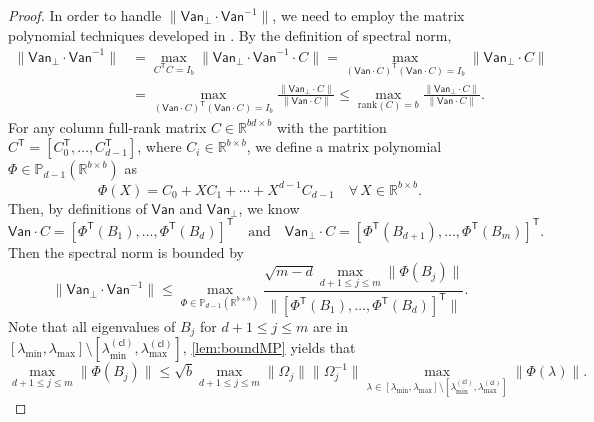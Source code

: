 \documentclass{article}
\newcommand{\Ttran}{\mathsf{T}}
\newcommand{\van}{\mathsf{Van}}
\newcommand{\poly}{\mathbb{P}}
\newcommand{\cl}{(\mathsf{cl})}
\newcommand{\R}{\mathbb{R}}
\newcommand{\rk}{\mathrm{rank}}
\providecommand{\norm}[1]{\lVert#1\rVert}
\providecommand{\bignorm}[1]{\bigl\lVert#1\bigr\rVert}
\begin{document}
\begin{proof}
In order to handle $\norm{\van_{\perp}\cdot\van^{-1}}$, we need to employ the matrix polynomial techniques developed in . 
By the definition of spectral norm, 
\begin{equation*}
    \begin{aligned}
        \norm{\van_{\perp}\cdot\van^{-1}} &= \max_{C^{\Ttran}C=I_{b}}\norm{\van_{\perp}\cdot\van^{-1}\cdot C} = \max_{(\van\cdot C)^{\Ttran}(\van\cdot C)=I_{b}}\norm{\van_{\perp}\cdot C}\\ 
        &= \max_{(\van\cdot C)^{\Ttran}(\van\cdot C)=I_{b}}\frac{\norm{\van_{\perp}\cdot C}}{\norm{\van\cdot C}} \leq \max_{\rk(C)=b}\frac{\norm{\van_{\perp}\cdot C}}{\norm{\van\cdot C}}.
    \end{aligned}
\end{equation*}
For any column full-rank matrix $C\in\R^{bd\times b}$ with the partition $C^{\Ttran}=[C_{0}^{\Ttran},\dotsc,C_{d-1}^{\Ttran}]$, where $C_{i}\in\R^{b\times b}$, we define a matrix polynomial $\Phi\in\poly_{d-1}(\R^{b\times b})$ as 
\begin{equation*}
    \Phi(X) = C_{0}+XC_{1}+\dotsb+X^{d-1}C_{d-1} \quad \forall\,X\in\R^{b\times b}.
\end{equation*} 
Then, by definitions of $\van$ and $\van_{\perp}$, we know 
\begin{equation*}
    \van\cdot C = 
    [   \Phi^{\Ttran}(B_{1}),\dotsc,
        \Phi^{\Ttran}(B_{d})]^{\Ttran}
    \quad \text{and}\quad 
    \van_{\perp}\cdot C = 
        [\Phi^{\Ttran}(B_{d+1}),\dotsc,
        \Phi^{\Ttran}(B_{m})]^{\Ttran}.
\end{equation*}
Then the spectral norm is bounded by 
\begin{equation}
    \label{eq:pfthmmain3}
    \norm{\van_{\perp}\cdot \van^{-1}} \leq \max_{\Phi\in\poly_{d-1}(\R^{b\times b})} \frac{\sqrt{m-d}\max\limits_{d+1\leq j\leq m}\norm{\Phi(B_{j})}}
    {\bignorm{[\Phi^{\Ttran}(B_{1}) 
        ,\dotsc,
        \Phi^{\Ttran}(B_{d})]^{\Ttran}}}.
\end{equation}
Note that all eigenvalues of $B_{j}$ for $d+1\leq j\leq m$ are in $[\lambda_{\min},\lambda_{\max}]\setminus [\lambda_{\min}^{\cl},\lambda_{\max}^{\cl}]$, \cref{lem:boundMP} yields that  
\begin{equation*}
    \max\limits_{d+1\leq j\leq m}\norm{\Phi(B_{j})}\leq \sqrt{b}\max_{d+1\leq j\leq m} \norm{\Omega_{j}}\norm{\Omega_{j}^{-1}} \max_{\lambda\in [\lambda_{\min},\lambda_{\max}]\setminus [\lambda_{\min}^{\cl},\lambda_{\max}^{\cl}]} \norm{\Phi(\lambda)}.
\end{equation*}

\end{proof}
\end{document}
